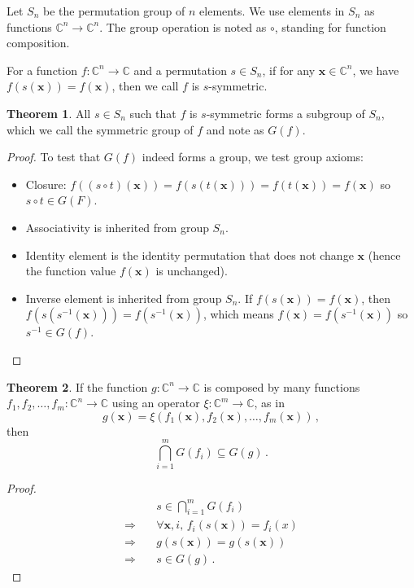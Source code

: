 \documentclass[]{article}
\newcommand{\vx}{\mathbf{x}}
\theoremstyle{definition}\newtheorem{theorem}{Theorem}
\begin{document}
Let $S_n$ be the permutation group of $n$ elements. We use elements in $S_n$ as functions $\mathbb{C}^n\rightarrow\mathbb{C}^n$. The group operation is noted as $\circ$, standing for function composition.

For a function $f: \mathbb{C}^n\rightarrow\mathbb{C}$ and a permutation $s \in S_n$, if for any $\vx\in\mathbb{C}^n$, we have $f(s(\vx)) = f(\vx) $, then we call $f$ is $s$-symmetric.

\begin{theorem}
	All $s \in S_n$ such that $f$ is $s$-symmetric forms a subgroup of $S_n$, which we call the symmetric group of $f$ and note as $G(f)$.
\end{theorem}
\begin{proof}
	To test that $G(f)$ indeed forms a group, we test group axioms:
	\begin{itemize}
		
	\item Closure: $
	f((s\circ t)(\vx)) = f(s(t(\vx))) = f(t(\vx)) = f(\vx)
	$ so $s\circ t \in G(F)$.
	\item Associativity is inherited from group $S_n$.
	\item Identity element is the identity permutation that does not change $\vx$ (hence the function value $f(\vx)$ is unchanged).
	\item Inverse element is inherited from group $S_n$. If  $f(s(\vx)) = f(\vx) $, then  $f(s(s^{-1}(\vx))) = f(s^{-1}(\vx))$, which means $f(\vx) = f(s^{-1}(\vx))$ so $s^{-1}\in G(f)$.
	
	\end{itemize}
\end{proof}


\begin{theorem}
	\label{composition}
	If the function $g: \mathbb{C}^n\rightarrow\mathbb{C}$ is composed by many functions $f_1, f_2,\dots, f_m: \mathbb{C}^n\rightarrow\mathbb{C}$ using an operator $\xi: \mathbb{C}^m\rightarrow\mathbb{C}$, as in \[g(\vx) = \xi(f_1(\vx), f_2(\vx),\dots,f_m(\vx))\,,\] then
	\[
		\bigcap_{i=1}^m G(f_i) \subseteq G(g)\,.
	\]
\end{theorem}
\begin{proof}
	\begin{align*}
		&s \in \bigcap_{i=1}^m G(f_i) \\
	\Rightarrow\quad& \forall \vx, i,\, f_i(s(\vx)) = f_i(x)\\
	\Rightarrow\quad& g(s(\vx)) = g(s(\vx)) \\
	\Rightarrow\quad& s \in  G(g)\,.
	\end{align*}
\end{proof}
\end{document}
